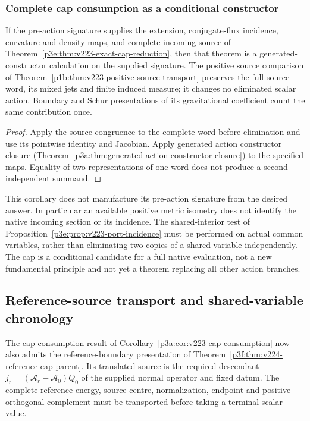 \documentclass[12pt,a4paper]{article}
\begin{document}
\subsubsection{Complete cap consumption as a conditional constructor}
\label{p3a:sec:v223-cap-consumption}
\begin{corollary}
\label{p3a:cor:v223-cap-consumption}
If the pre-action signature supplies the extension, conjugate-flux
incidence, curvature and density maps, and complete incoming source of
Theorem~\ref{p3e:thm:v223-exact-cap-reduction}, then that theorem is a
generated-constructor calculation on the supplied signature.  The
positive source comparison of
Theorem~\ref{p1b:thm:v223-positive-source-transport} preserves the full
source word, its mixed jets and finite induced measure; it changes no
eliminated scalar action.  Boundary and Schur presentations of its
gravitational coefficient count the same contribution once.
\end{corollary}
\begin{proof}
Apply the source congruence to the complete word before elimination and
use its pointwise identity and Jacobian.  Apply generated action
constructor closure (Theorem~\ref{p3a:thm:generated-action-constructor-closure})
to the specified maps.  Equality of two representations of one word
does not produce a second independent summand.
\end{proof}
This corollary does not manufacture its pre-action signature from the
desired answer.  In particular an available positive metric isometry
does not identify the native incoming section or its incidence.  The
shared-interior test of Proposition~\ref{p3e:prop:v223-port-incidence}
must be performed on actual common variables, rather than eliminating
two copies of a shared variable independently.  The cap is a conditional
candidate for a full native evaluation, not a new fundamental principle
and not yet a theorem replacing all other action branches.


\subsection{Reference-source transport and shared-variable chronology}
\label{p3a:sec:v224-source-chronology}
The cap consumption result of Corollary~\ref{p3a:cor:v223-cap-consumption}
now also admits the reference-boundary presentation of
Theorem~\ref{p3f:thm:v224-reference-cap-parent}. Its translated source is
the required descendant $j_r=(\mathcal A_r-\mathcal A_0)Q_0$ of
the supplied normal operator and fixed datum. The complete reference
energy, source centre, normalization, endpoint and positive orthogonal
complement must be transported before taking a terminal scalar value.
\end{document}

